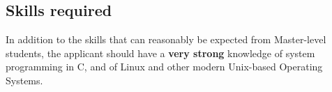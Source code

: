 \documentclass[a4paper,11pt]{article}
\begin{document}


\subsection*{Skills required}

In addition to the skills that can reasonably be expected from Master-level
students, the applicant should have a \textbf{very strong} knowledge of system
programming in C, and of Linux and other modern Unix-based Operating Systems.
\end{document}
